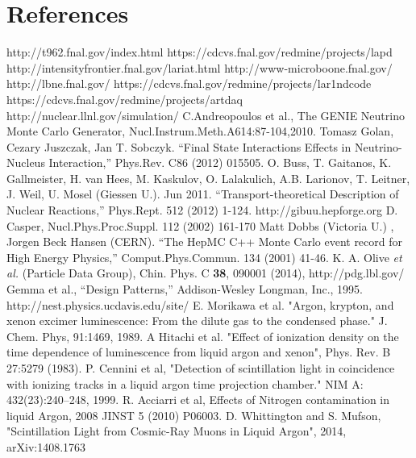 \documentclass[12pt]{elsarticle}
\begin{document}
\section{References}

\begin{thebibliography}{99}

 http://t962.fnal.gov/index.html
 https://cdcvs.fnal.gov/redmine/projects/lapd
 http://intensityfrontier.fnal.gov/lariat.html
 http://www-microboone.fnal.gov/
 http://lbne.fnal.gov/
 https://cdcvs.fnal.gov/redmine/projects/lar1ndcode
 https://cdcvs.fnal.gov/redmine/projects/artdaq
 http://nuclear.llnl.gov/simulation/
 C.Andreopoulos et al., The GENIE Neutrino Monte Carlo Generator, Nucl.Instrum.Meth.A614:87-104,2010.
 Tomasz Golan, Cezary Juszczak, Jan T. Sobczyk. ``Final State Interactions Effects in Neutrino-Nucleus Interaction,'' Phys.Rev. C86 (2012) 015505.
 O. Buss, T. Gaitanos, K. Gallmeister, H. van Hees, M. Kaskulov, O. Lalakulich, A.B. Larionov, T. Leitner, J. Weil, U. Mosel (Giessen U.). Jun 2011. ``Transport-theoretical Description of Nuclear Reactions,'' Phys.Rept. 512 (2012) 1-124. http://gibuu.hepforge.org
 D. Casper, Nucl.Phys.Proc.Suppl. 112 (2002) 161-170
 Matt Dobbs (Victoria U.) , Jorgen Beck Hansen (CERN). ``The HepMC C++ Monte Carlo event record for High Energy Physics,'' Comput.Phys.Commun. 134 (2001) 41-46.
 K. A. Olive {\it et al.} (Particle Data Group), Chin. Phys. C {\bf 38}, 090001 (2014), http://pdg.lbl.gov/
 Gemma et al., ``Design Patterns,'' Addison-Wesley Longman, Inc., 1995. 
 http://nest.physics.ucdavis.edu/site/
 E. Morikawa et al. "Argon, krypton, and xenon excimer luminescence: From the dilute gas to the condensed phase." J. Chem. Phys, 91:1469, 1989.
 A Hitachi et al. "Effect of ionization density on the time dependence of luminescence from liquid argon and xenon", Phys. Rev. B 27:5279 (1983). 
 P. Cennini et al, "Detection of scintillation light in coincidence with ionizing tracks in a liquid argon time projection chamber." NIM A: 432(23):240–248, 1999. 
 R. Acciarri et al, Effects of Nitrogen contamination in liquid Argon, 2008 JINST 5 (2010) P06003.  
 D. Whittington and S. Mufson, "Scintillation Light from Cosmic-Ray Muons in Liquid Argon", 2014, arXiv:1408.1763

\end{thebibliography}
\end{document}
